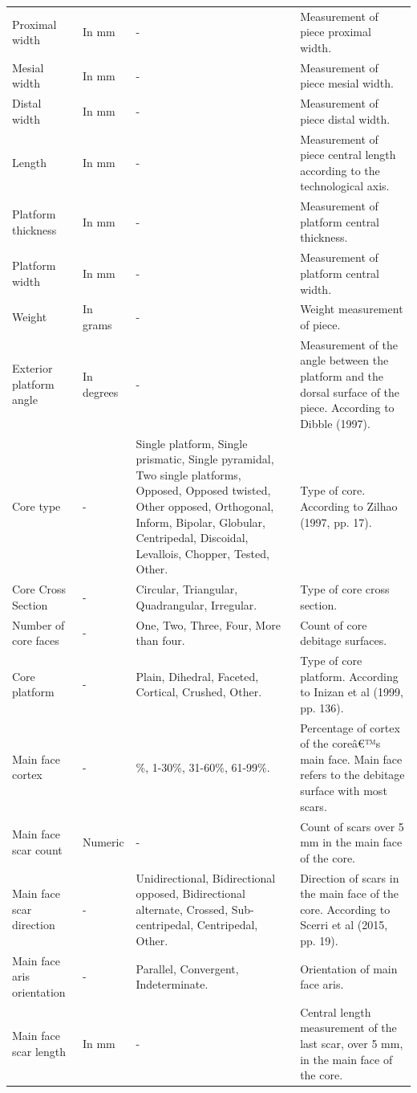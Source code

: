 \documentclass[12pt,twoside]{reedthesis}
\begin{document}
\begin{landscape}
\begin{longtable}[t]{>{\raggedright\arraybackslash}p{2cm}>{\raggedright\arraybackslash}p{3cm}>{\raggedright\arraybackslash}p{6cm}>{\raggedright\arraybackslash}p{9cm}}
Proximal width & In mm & - & Measurement of piece proximal width.\\
Mesial width & In mm & - & Measurement of piece mesial width.\\
Distal width & In mm & - & Measurement of piece distal width.\\
Length & In mm & - & Measurement of piece central length according to the technological axis.\\
\addlinespace
Platform thickness & In mm & - & Measurement of platform central thickness.\\
Platform width & In mm & - & Measurement of platform central width.\\
Weight & In grams & - & Weight measurement of piece.\\
Exterior platform angle & In degrees & - & Measurement of the angle between the platform and the dorsal surface of the piece. According to Dibble (1997).\\
Core type & - & Single platform, Single prismatic, Single pyramidal, Two single platforms, Opposed, Opposed twisted, Other opposed, Orthogonal, Inform, Bipolar, Globular, Centripedal, Discoidal, Levallois, Chopper, Tested, Other. & Type of core. According to Zilhao (1997, pp. 17).\\
\addlinespace
Core Cross Section & - & Circular, Triangular, Quadrangular, Irregular. & Type of core cross section.\\
Number of core faces & - & One, Two, Three, Four, More than four. & Count of core debitage surfaces.\\
Core platform & - & Plain, Dihedral, Faceted, Cortical, Crushed, Other. & Type of core platform. According to Inizan et al (1999, pp. 136).\\
Main face cortex & - & 0\%, 1-30\%, 31-60\%, 61-99\%. & Percentage of cortex of the coreâ€™s main face. Main face refers to the debitage surface with most scars.\\
Main face scar count & Numeric & - & Count of scars over 5 mm in the main face of the core.\\
\addlinespace
Main face scar direction & - & Unidirectional, Bidirectional opposed, Bidirectional alternate, Crossed, Sub-centripedal, Centripedal, Other. & Direction of scars in the main face of the core. According to Scerri et al (2015, pp. 19).\\
Main face aris orientation & - & Parallel, Convergent, Indeterminate. & Orientation of main face aris.\\
Main face scar length & In mm & - & Central length measurement of the last scar, over 5 mm, in the main face of the core.\\

\end{longtable}
\end{landscape}
\end{document}
